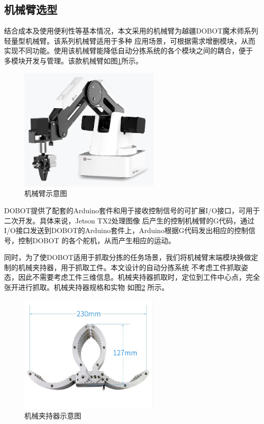 \subsection{机械臂选型}

结合成本及使用便利性等基本情况，本文采用的机械臂为越疆DOBOT魔术师系列轻量型机械臂。该系列机械臂适用于多种
应用场景，可根据需求增删模块，从而实现不同功能。使用该机械臂能降低自动分拣系统的各个模块之间的耦合，便于
多模块开发与管理。该款机械臂如图\ref{fig:robot}所示。

\begin{figure}[h]
    \centering
    \includegraphics[width=0.6\textwidth]{pic/chap2/robot.jpg}
    \caption{机械臂示意图}
    \label{fig:robot}
\end{figure}

DOBOT提供了配套的Arduino套件和用于接收控制信号的可扩展I/O接口，可用于二次开发。具体来说，Jetson TX2处理图像
后产生的控制机械臂的G代码，通过I/O接口发送到DOBOT的Arduino套件上，Arduino根据G代码发出相应的控制信号，控制DOBOT
的各个舵机，从而产生相应的运动。

同时，为了使DOBOT适用于抓取分拣的任务场景，我们将机械臂末端模块换做定制的机械夹持器，用于抓取工件。本文设计的自动分拣系统
不考虑工件抓取姿态，因此不需要考虑工件三维信息。机械夹持器抓取时，定位到工件中心点，完全张开进行抓取。机械夹持器规格和实物
如图\ref{fig:grip} 所示。

\begin{figure}[h]
    \centering
    \includegraphics[width=0.6\textwidth]{pic/chap2/grip.png}
    \caption{机械夹持器示意图}
    \label{fig:grip}
\end{figure}


